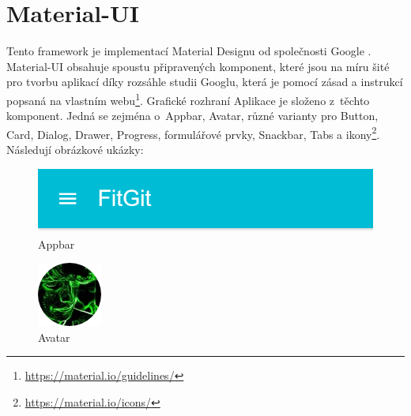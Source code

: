 \section{Material-UI}

Tento framework je implementací Material Designu od společnosti Google \cite{material-from-google}. Material-UI obsahuje spoustu připravených komponent, které jsou na míru šité pro tvorbu aplikací díky rozsáhle studii Googlu, která je pomocí zásad a instrukcí popsaná na vlastním webu\footnote{\url{https://material.io/guidelines/}}. Grafické rozhraní Aplikace je složeno z~těchto komponent. Jedná se zejména o~Appbar, Avatar, různé varianty pro Button, Card, Dialog, Drawer, Progress, formulářové prvky, Snackbar, Tabs a ikony\footnote{\url{https://material.io/icons/}}. Následují obrázkové ukázky:

\FloatBarrier

\begin{figure}[ht]
	\centering
	\includegraphics[scale=0.5]{sections/ui/images/Appbar.png}
	\caption{Appbar}
	\label{fig:appbar}
\end{figure}

\begin{figure}[ht]
	\centering
	\includegraphics[scale=0.5]{sections/ui/images/Avatar.png}
	\caption{Avatar}
	\label{fig:avatar}
\end{figure}

